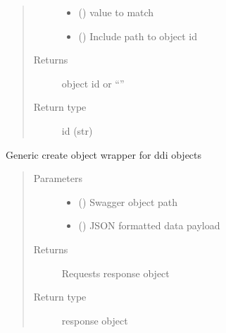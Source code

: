 \documentclass[letterpaper,10pt,english]{sphinxmanual}
\begin{document}
\begin{fulllineitems}
\begin{fulllineitems}
\begin{quote}
\begin{description}
\begin{itemize}
\item {} 
\sphinxAtStartPar
{} () \textendash{} value to match

\item {} 
\sphinxAtStartPar
{} () \textendash{} Include path to object id

\end{itemize}

\item[{Returns}] \leavevmode
\sphinxAtStartPar
object id or “”

\item[{Return type}] \leavevmode
\sphinxAtStartPar
id (str)

\end{description}\end{quote}

\end{fulllineitems}


\begin{fulllineitems}
\label{\detokenize{b1anycast-class:bloxone.b1anycast.update}}
\sphinxAtStartPar
Generic create object wrapper for ddi objects
\begin{quote}\begin{description}
\item[{Parameters}] \leavevmode\begin{itemize}
\item {} 
\sphinxAtStartPar
{} () \textendash{} Swagger object path

\item {} 
\sphinxAtStartPar
{} () \textendash{} JSON formatted data payload

\end{itemize}

\item[{Returns}] \leavevmode
\sphinxAtStartPar
Requests response object

\item[{Return type}] \leavevmode
\sphinxAtStartPar
response object

\end{description}\end{quote}

\end{fulllineitems}


\end{fulllineitems}
\end{document}
